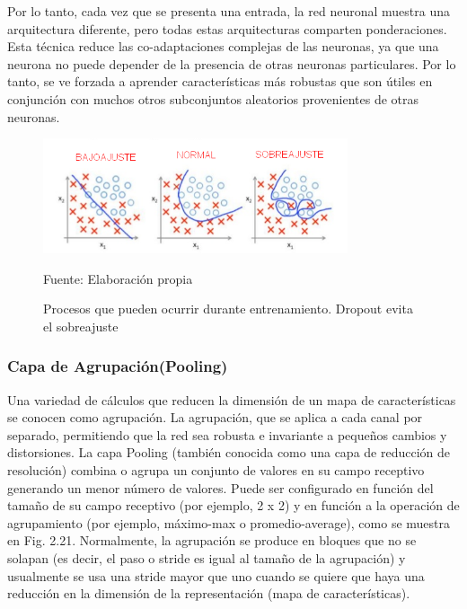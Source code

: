 		\vskip 0.4cm 
		Por lo tanto, cada vez que se presenta una entrada, la red neuronal muestra una arquitectura diferente, pero todas estas arquitecturas comparten ponderaciones. Esta técnica reduce las co-adaptaciones complejas de las neuronas, ya que una neurona no puede depender de la presencia de otras neuronas particulares. Por lo tanto, se ve forzada a aprender características más robustas que son útiles en conjunción con muchos otros subconjuntos aleatorios provenientes de otras neuronas.
		\begin{figure}[H]
		\begin{center}
		\includegraphics[width=0.8\textwidth]{images/marcoteorico/dropout}
		\end{center}
		\begin{center}
		\caption{\small{Procesos que pueden ocurrir durante entrenamiento. Dropout evita el sobreajuste}}
		\vskip -0.3cm  
		{\small{Fuente: Elaboración propia}}
		\end{center}
		\vspace{-1.5em}
		\end{figure}

		\vskip 0.4cm 
	\subsubsection {Capa de Agrupación(Pooling)}
		\vskip 0.4cm 

		Una variedad de cálculos que reducen la dimensión de un mapa de características se conocen como agrupación. La agrupación, que se aplica a cada canal por separado, permitiendo que la red sea robusta e invariante a pequeños cambios y distorsiones. La capa Pooling (también conocida como una capa de reducción de resolución) combina o agrupa un conjunto de valores en su campo receptivo generando un menor número de valores. Puede ser configurado en función del tamaño de su campo receptivo (por ejemplo, 2 x 2) y en función a la operación de agrupamiento (por ejemplo, máximo-max o promedio-average), como se muestra en Fig. 2.21. Normalmente, la agrupación se produce en bloques que no se solapan (es decir, el paso o stride es igual al tamaño de la agrupación) y usualmente se usa una stride mayor que uno cuando se quiere que haya una reducción en la dimensión de la representación (mapa de características).

